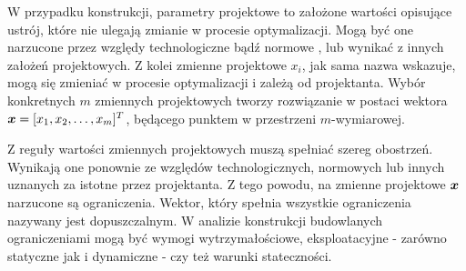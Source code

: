 W przypadku konstrukcji, parametry projektowe to założone wartości opisujące ustrój, które nie ulegają zmianie w procesie optymalizacji.  Mogą być one narzucone przez względy technologiczne bądź normowe \parencite{Szymczak1995}, lub wynikać z innych założeń projektowych. Z kolei zmienne projektowe $x_i$, jak sama nazwa wskazuje, mogą się zmieniać w procesie optymalizacji i zależą od projektanta. Wybór konkretnych $m$ zmiennych projektowych tworzy rozwiązanie w postaci wektora $\bm{x}=[x_1,x_2,\dots,x_m]^T$, będącego punktem w przestrzeni $m$-wymiarowej.

Z reguły wartości zmiennych projektowych muszą spełniać szereg obostrzeń. Wynikają one ponownie ze względów technologicznych, normowych lub innych uznanych za istotne przez projektanta. Z tego powodu, na zmienne projektowe $\bm{x}$ narzucone są ograniczenia. Wektor, który spełnia wszystkie ograniczenia nazywany jest dopuszczalnym. W analizie konstrukcji budowlanych ograniczeniami mogą być wymogi wytrzymałościowe, eksploatacyjne - zarówno statyczne jak i dynamiczne - czy też warunki stateczności.


